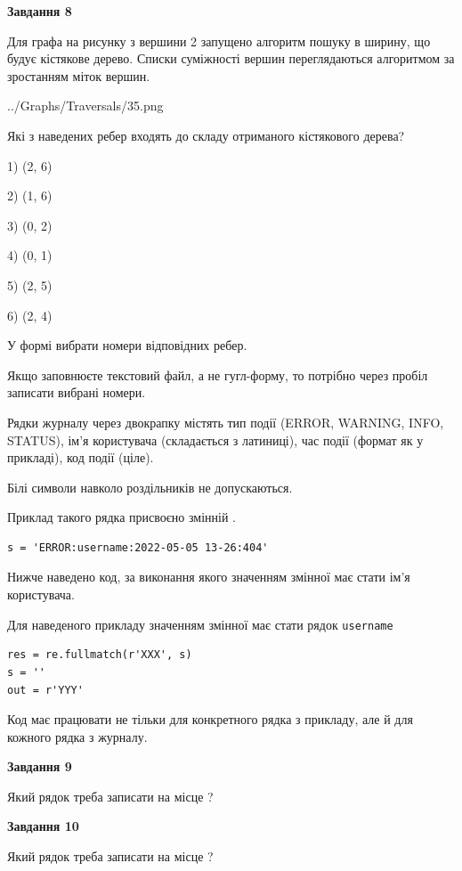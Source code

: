 \documentclass[12pt, ukrainian]{article}
\def\code#1{\Verb!#1!}
\begin{document}
{\begin {large}
{\begin {center}\textbf{Завдання 8}\end {center}}\par
Для графа на рисунку з вершини 2 запущено алгоритм пошуку в ширину, що будує кістякове дерево. Списки суміжності вершин переглядаються алгоритмом за зростанням міток вершин.\par
\begin{center}
	{../Graphs/Traversals/35.png}
\end{center}
\par Які з наведених ребер входять до складу отриманого кістякового дерева?\par
1) (2, 6)\par
2) (1, 6)\par
3) (0, 2)\par
4) (0, 1)\par
5) (2, 5)\par
6) (2, 4)\par
{\vskip 15pt} У формі вибрати номери відповідних ребер.


Якщо заповнюєте текстовий файл, а не гугл-форму, то потрібно через пробіл записа\-ти вибрані номери.\par
\newpage


Рядки журналу через двокрапку містять тип події (ERROR, WARNING, INFO, STATUS), ім'я користувача (складається з латиниці), час події (фор\-мат як у прикладі), код події (ціле).

Білі символи навколо роздільників не допускаються.

Приклад такого рядка присвоєно змінній .



\begin{verbatim}
s = 'ERROR:username:2022-05-05 13-26:404'
\end{verbatim}


Нижче наведено код, за виконання якого значенням змінної  має стати ім'я користувача.

Для наведеного прикладу значенням змінної  має стати рядок \code{username}



\begin{verbatim}
res = re.fullmatch(r'XXX', s)
s = ''
out = r'YYY'
\end{verbatim}


Код має працювати не тільки для конкретного рядка з прикладу, але й для кожного рядка з журналу.

{\begin {center}\textbf{Завдання 9}\end {center}}\par
Який рядок треба записати на місце  ?\par
\vspace{5mm}


{\begin {center}\textbf{Завдання 10}\end {center}}\par
Який рядок треба записати на місце  ?\par


\newpage


\end {large}}
\end{document}
